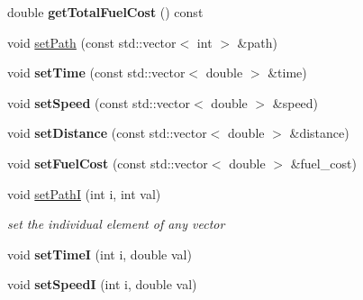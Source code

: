 \begin{DoxyCompactItemize}
\item 
\hypertarget{class_p_a_s_o_solution_ae09d905a6e9bd68977ebee004bdd02ad}{}double {\bfseries get\+Total\+Fuel\+Cost} () const \label{class_p_a_s_o_solution_ae09d905a6e9bd68977ebee004bdd02ad}

\item 
void \hyperlink{class_p_a_s_o_solution_a50ce31086cbe40db7b50b305a6fc7760}{set\+Path} (const std\+::vector$<$ int $>$ \&path)
\item 
\hypertarget{class_p_a_s_o_solution_a46e0fed24f4c25d3faf01d200da91a75}{}void {\bfseries set\+Time} (const std\+::vector$<$ double $>$ \&time)\label{class_p_a_s_o_solution_a46e0fed24f4c25d3faf01d200da91a75}

\item 
\hypertarget{class_p_a_s_o_solution_a8c67841cdfe12d9cac1b5e92b44e1303}{}void {\bfseries set\+Speed} (const std\+::vector$<$ double $>$ \&speed)\label{class_p_a_s_o_solution_a8c67841cdfe12d9cac1b5e92b44e1303}

\item 
\hypertarget{class_p_a_s_o_solution_ad461fd92c2fb0019f2a0b37f2dfa344a}{}void {\bfseries set\+Distance} (const std\+::vector$<$ double $>$ \&distance)\label{class_p_a_s_o_solution_ad461fd92c2fb0019f2a0b37f2dfa344a}

\item 
\hypertarget{class_p_a_s_o_solution_a07abbc2df133dc45abdec3c968d58fdd}{}void {\bfseries set\+Fuel\+Cost} (const std\+::vector$<$ double $>$ \&fuel\+\_\+cost)\label{class_p_a_s_o_solution_a07abbc2df133dc45abdec3c968d58fdd}

\item 
\hypertarget{class_p_a_s_o_solution_adc48a4c417e37ac8be5a057acba73df6}{}void \hyperlink{class_p_a_s_o_solution_adc48a4c417e37ac8be5a057acba73df6}{set\+Path\+I} (int i, int val)\label{class_p_a_s_o_solution_adc48a4c417e37ac8be5a057acba73df6}

\begin{DoxyCompactList}\small\item\em set the individual element of any vector \end{DoxyCompactList}\item 
\hypertarget{class_p_a_s_o_solution_a123ad18666e6ea32c2e921ca6b094cb7}{}void {\bfseries set\+Time\+I} (int i, double val)\label{class_p_a_s_o_solution_a123ad18666e6ea32c2e921ca6b094cb7}

\item 
\hypertarget{class_p_a_s_o_solution_aafa4c96c9784c787b516f830d3d9f7c9}{}void {\bfseries set\+Speed\+I} (int i, double val)\label{class_p_a_s_o_solution_aafa4c96c9784c787b516f830d3d9f7c9}


\end{DoxyCompactItemize}
